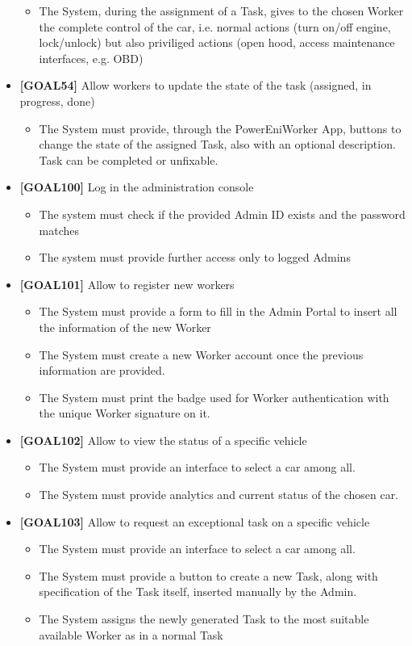 \begin{itemize}
	\begin{itemize}
	\item The System, during the assignment of a Task, gives to the chosen Worker the complete control of the car, i.e. normal actions (turn on/off engine, lock/unlock) but also priviliged actions (open hood, access maintenance interfaces, e.g. OBD)
	\end{itemize}
\item \textbf{[GOAL54]} Allow workers to update the state of the task (assigned, in progress, done)
	\begin{itemize}
	\item The System must provide, through the PowerEniWorker App, buttons to change the state of the assigned Task, also with an optional description. Task can be completed or unfixable.
	\end{itemize}
\item \textbf{[GOAL100]} Log in the administration console
	\begin{itemize}
	\item The system must check if the provided Admin ID exists and the password matches
	\item The system must provide further access only to logged Admins
	\end{itemize}
\item \textbf{[GOAL101]} Allow to register new workers
	\begin{itemize}
	\item The System must provide a form to fill in the Admin Portal to insert all the information of the new Worker
	\item The System must create a new Worker account once the previous information are provided.
	\item The System must print the badge used for Worker authentication with the unique Worker signature on it.
	\end{itemize}
\item \textbf{[GOAL102]} Allow to view the status of a specific vehicle
	\begin{itemize}
	\item The System must provide an interface to select a car among all.
	\item The System must provide analytics and current status of the chosen car.
	\end{itemize}
\item \textbf{[GOAL103]} Allow to request an exceptional task on a specific vehicle
	\begin{itemize}
	\item The System must provide an interface to select a car among all.
	\item The System must provide a button to create a new Task, along with specification of the Task itself, inserted manually by the Admin.
	\item The System assigns the newly generated Task to the most suitable available Worker as in a normal Task
	\end{itemize}
\end{itemize}
